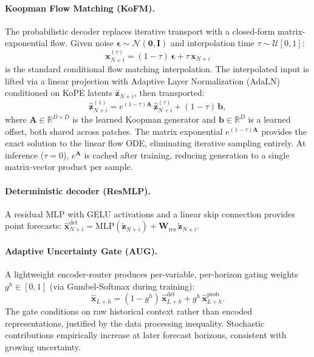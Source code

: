 \documentclass[11pt,a4paper]{article}
\begin{document}
\paragraph{Koopman Flow Matching (KoFM).}
The probabilistic decoder replaces iterative transport with a closed-form matrix-exponential flow. Given noise $\boldsymbol{\epsilon} \sim \mathcal{N}(\mathbf{0}, \mathbf{I})$ and interpolation time $\tau \sim \mathcal{U}[0,1]$:
\begin{equation}
  \mathbf{x}^{(\tau)}_{N+i} = (1 - \tau)\,\boldsymbol{\epsilon} + \tau\,\mathbf{x}_{N+i}
\end{equation}
is the standard conditional flow matching interpolation. The interpolated input is lifted via a linear projection with Adaptive Layer Normalization (AdaLN) conditioned on KoPE latents $\hat{\mathbf{z}}_{N+i}$, then transported:
\begin{equation}
  \hat{\mathbf{z}}^{(1)}_{N+i} = e^{(1-\tau)\mathbf{A}}\,\hat{\mathbf{z}}^{(\tau)}_{N+i} + (1-\tau)\,\mathbf{b},
\end{equation}
where $\mathbf{A} \in \mathbb{R}^{D \times D}$ is the learned Koopman generator and $\mathbf{b} \in \mathbb{R}^D$ is a learned offset, both shared across patches. The matrix exponential $e^{(1-\tau)\mathbf{A}}$ provides the exact solution to the linear flow ODE, eliminating iterative sampling entirely. At inference ($\tau{=}0$), $e^{\mathbf{A}}$ is cached after training, reducing generation to a single matrix-vector product per sample.

\paragraph{Deterministic decoder (ResMLP).}
A residual MLP with GELU activations and a linear skip connection provides point forecasts: $\hat{\mathbf{x}}^{\mathrm{det}}_{N+i} = \mathrm{MLP}(\tilde{\mathbf{z}}_{N+i}) + \mathbf{W}_{\mathrm{res}}\,\tilde{\mathbf{z}}_{N+i}$.

\paragraph{Adaptive Uncertainty Gate (AUG).}
A lightweight encoder-router produces per-variable, per-horizon gating weights $g^h \in [0,1]$ (via Gumbel-Softmax during training):
\begin{equation}
  \hat{\mathbf{x}}_{L+h} = (1 - g^h)\,\hat{\mathbf{x}}^{\mathrm{det}}_{L+h} + g^h\,\hat{\mathbf{x}}^{\mathrm{prob}}_{L+h}.
\end{equation}
The gate conditions on raw historical context rather than encoded representations, justified by the data processing inequality. Stochastic contributions empirically increase at later forecast horizons, consistent with growing uncertainty.
\end{document}
